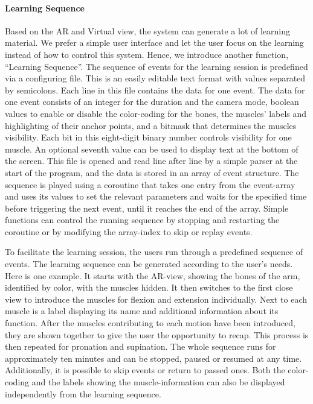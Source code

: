 \paragraph{Learning Sequence}
Based on the AR and Virtual view, the system can generate a lot of learning material. We prefer a simple user interface and let the user focus on the learning instead of how to control this system. 
Hence, we introduce another function, ``Learning Sequence''.
The sequence of events for the learning session is predefined via a configuring file. This is an easily editable text format with values separated by semicolons. Each line in this file contains the data for one event. The data for one event consists of an integer for the duration and the camera mode, boolean values to enable or disable the color-coding for the bones, the muscles' labels and highlighting of their anchor points, and a bitmask that determines the muscles visibility. Each bit in this eight-digit binary number controls visibility for one muscle. An optional seventh value can be used to display text at the bottom of the screen. 
This file is opened and read line after line by a simple parser at the start of the program, and the data is stored in an array of event structure. 
The sequence is played using a coroutine that takes one entry from the event-array and uses its values to set the relevant parameters and waits for the specified time before triggering the next event, until it reaches the end of the array. Simple functions can control the running sequence by stopping and restarting the coroutine or by modifying the array-index to skip or replay events.

To facilitate the learning session, the users run through a predefined sequence of events. The learning sequence can be generated according to the user's needs. Here is one example. 
It starts with the AR-view, showing the bones of the arm, identified by color, with the muscles hidden. It then switches to the first close view to introduce the muscles for flexion and extension individually. Next to each muscle is a label displaying its name and additional information about its function. After the muscles contributing to each motion have been introduced, they are shown together to give the user the opportunity to recap. This process is then repeated for pronation and supination. 
The whole sequence runs for approximately ten minutes and can be stopped, paused or resumed at any time. Additionally, it is possible to skip events or return to passed ones. Both the color-coding and the labels showing the muscle-information can also be displayed independently from the learning sequence.

